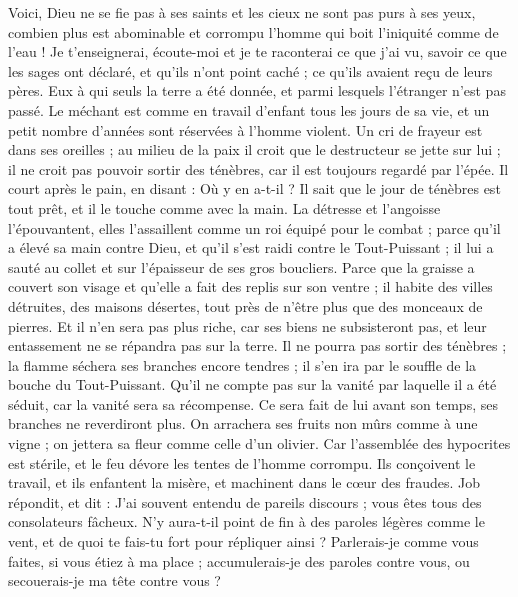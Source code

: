 \begin{multicols}{2}
Voici, Dieu ne se fie pas à ses saints et les cieux ne sont pas purs à ses yeux,
combien plus est abominable et corrompu l'homme qui boit l'iniquité comme de l'eau ! 
Je t'enseignerai, écoute-moi et je te raconterai ce que j'ai vu,
savoir ce que les sages ont déclaré, et qu'ils n'ont point caché ; ce qu'ils avaient reçu de leurs pères.
Eux à qui seuls la terre a été donnée, et parmi lesquels l'étranger n'est pas passé.
Le méchant est comme en travail d'enfant tous les jours de sa vie, et un petit nombre d'années sont réservées à l'homme violent.
Un cri de frayeur est dans ses oreilles ; au milieu de la paix il croit que le destructeur se jette sur lui ;
il ne croit pas pouvoir sortir des ténèbres, car il est toujours regardé par l'épée.
Il court après le pain, en disant : Où y en a-t-il ? Il sait que le jour de ténèbres est tout prêt, et il le touche comme avec la main.
La détresse et l'angoisse l'épouvantent, elles l'assaillent comme un roi équipé pour le combat ;
parce qu'il a élevé sa main contre Dieu, et qu'il s'est raidi contre le Tout-Puissant ;
il lui a sauté au collet et sur l'épaisseur de ses gros boucliers. 
Parce que la graisse a couvert son visage et qu'elle a fait des replis sur son ventre ;
 il habite des villes détruites, des maisons désertes, tout près de n'être plus que des monceaux de pierres. 
Et il n'en sera pas plus riche, car ses biens ne subsisteront pas, et leur entassement ne se répandra pas sur la terre.
Il ne pourra pas sortir des ténèbres ; la flamme séchera ses branches encore tendres ; il s'en ira par le souffle de la bouche du Tout-Puissant.
Qu'il ne compte pas sur la vanité par laquelle il a été séduit, car la vanité sera sa récompense.
Ce sera fait de lui avant son temps, ses branches ne reverdiront plus. 
On arrachera ses fruits non mûrs comme à une vigne ; on jettera sa fleur comme celle d'un olivier. 
Car l'assemblée des hypocrites est stérile, et le feu dévore les tentes de l'homme corrompu.
Ils conçoivent le travail, et ils enfantent la misère, et machinent dans le cœur des fraudes.
\VerseOne{}Job répondit, et dit :
J'ai souvent entendu de pareils discours ; vous êtes tous des consolateurs fâcheux.
N'y aura-t-il point de fin à des paroles légères comme le vent, et de quoi te fais-tu fort pour répliquer ainsi ?
Parlerais-je comme vous faites, si vous étiez à ma place ; accumulerais-je des paroles contre vous, ou secouerais-je ma tête contre vous ? 

\end{multicols}
